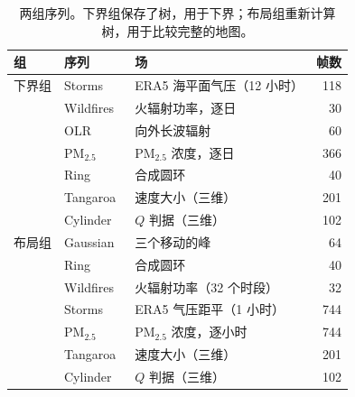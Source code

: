 \begin{table}[t]
\centering
\caption{两组序列。下界组保存了树，用于下界；布局组重新计算树，用于比较完整的地图。}
\label{tab:data}
\footnotesize
\setlength{\tabcolsep}{2pt}
\renewcommand{\arraystretch}{0.95}
\begin{tabular*}{\columnwidth}{@{\extracolsep{\fill}}lllr@{}}
\toprule
组 & 序列 & 场 & 帧数 \\
\midrule
下界组 & Storms~\cite{Hersbach:2020:ERA5} & ERA5 海平面气压（12 小时） & 118 \\
 & Wildfires~\cite{Franke:2021:1DP} & 火辐射功率，逐日 & 30 \\
 & OLR~\cite{NOAA:OLR} & 向外长波辐射 & 60 \\
 & PM$_{2.5}$~\cite{Dong:2026:PM25} & PM$_{2.5}$ 浓度，逐日 & 366 \\
 & Ring & 合成圆环 & 40 \\
 & Tangaroa~\cite{Popinet:2004:Tangaroa} & 速度大小（三维） & 201 \\
 & Cylinder~\cite{Camarri:2005:Cylinder} & $Q$ 判据（三维） & 102 \\
\midrule
布局组 & Gaussian & 三个移动的峰 & 64 \\
 & Ring & 合成圆环 & 40 \\
 & Wildfires & 火辐射功率（32 个时段） & 32 \\
 & Storms & ERA5 气压距平（1 小时） & 744 \\
 & PM$_{2.5}$~\cite{Kong:2021:CAQRA} & PM$_{2.5}$ 浓度，逐小时 & 744 \\
 & Tangaroa & 速度大小（三维） & 201 \\
 & Cylinder & $Q$ 判据（三维） & 102 \\
\bottomrule
\end{tabular*}
\end{table}

